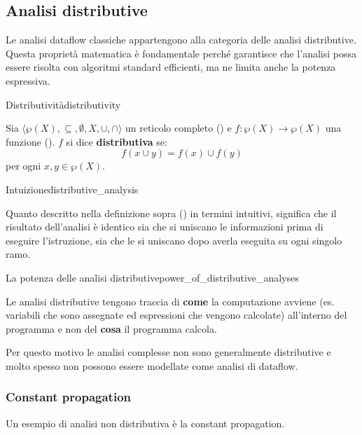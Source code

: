 \subsection{Analisi distributive}

Le analisi dataflow classiche appartengono alla categoria delle analisi
distributive.
Questa proprietà matematica è fondamentale perché garantisce che l'analisi
possa essere risolta con algoritmi standard efficienti, ma ne limita anche la
potenza espressiva.

\begin{definizione}{Distributività}{distributivity}

Sia $\langle \wp(X), \subseteq, \emptyset, X, \cup, \cap \rangle$ un
reticolo completo () e $f: \wp(X) \to \wp(X)$
una funzione (). $f$ si dice \textbf{distributiva} se:
\[ f(x \cup y) = f(x) \cup f(y) \]
per ogni $x, y \in \wp(X)$.

\end{definizione}

\begin{nota}{Intuizione}{distributive_analysis}

Quanto descritto nella definizione sopra ()
in termini intuitivi, significa che il risultato dell'analisi è identico sia
che si uniscano le informazioni prima di eseguire l'istruzione, sia
che le si uniscano dopo averla eseguita su ogni singolo ramo.

\end{nota}

\begin{nota}{La potenza delle analisi distributive}{power_of_distributive_analyses}

Le analisi distributive tengono traccia di \textbf{come} la computazione avviene
(es. variabili che sono assegnate ed espressioni che vengono calcolate)
all'interno del programma e non del \textbf{cosa} il programma calcola.

Per questo motivo le analisi complesse non sono generalmente distributive e molto
spesso non possono essere modellate come analisi di dataflow.

\end{nota}

\subsubsection{Constant propagation}

Un esempio di analisi non distributiva è la constant propagation.

